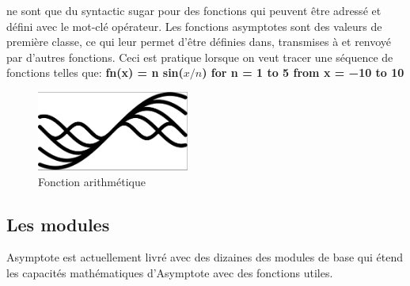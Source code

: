 \documentclass[a4paper]{report}
\begin{document}
ne sont que du syntactic sugar pour des fonctions qui peuvent être
adressé et défini avec le mot-clé opérateur.
Les fonctions asymptotes sont des valeurs de première classe, ce qui leur permet d'être définies dans, transmises à et
renvoyé par d'autres fonctions. Ceci est pratique lorsque
on veut tracer une séquence de fonctions telles que:
\textbf{fn(x) = n sin($x/n$) for  n = 1 to 5 from x = −10 to 10}\\
    \begin{figure}[!h] 
        \centering
        \includegraphics[width=5cm]{images/cap1.png}
        \caption{Fonction arithmétique} 
        \label{Fonction arithmétique}
    \end{figure}
\newpage
\subsection{Les modules}
Asymptote est actuellement livré avec des dizaines des modules de base qui étend les capacités mathématiques d'Asymptote avec des fonctions utiles.
\end{document}
